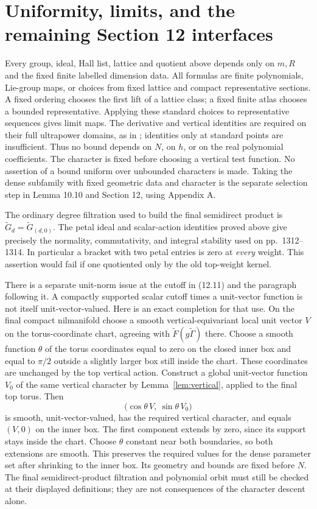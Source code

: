 \documentclass[11pt]{article}
\begin{document}
\section{Uniformity, limits, and the remaining Section 12 interfaces}
Every group, ideal, Hall list, lattice and quotient above depends only on
$m,R$ and the fixed finite labelled dimension data. All formulas are finite
polynomials, Lie-group maps, or choices from fixed lattice and compact
representative sections. A fixed ordering chooses the first lift of a lattice
class; a fixed finite atlas chooses a bounded representative. Applying these
standard choices to representative sequences gives limit maps. The derivative
and vertical identities are required on their full ultrapower domains,
as in \cite{TAUT}; identities only at standard points are insufficient.
Thus no bound depends on $N$, on $h$, or on the real polynomial coefficients.
The character is fixed before choosing a vertical test function. No assertion
of a bound uniform over unbounded characters is made. Taking the dense
subfamily with fixed geometric data and character is the separate selection
step in Lemma 10.10 and Section 12, using Appendix A.

The ordinary degree filtration used to build the final semidirect product
is $\widetilde G_d=\widetilde G_{(d,0)}$. The petal ideal and scalar-action
identities proved above give precisely the normality, commutativity, and
integral stability used on pp.~1312--1314. In particular a bracket with two
petal entries is zero at \emph{every} weight. This assertion would fail if
one quotiented only by the old top-weight kernel.

There is a separate unit-norm issue at the cutoff in (12.11) and the paragraph
following it. A compactly supported scalar cutoff times a unit-vector function
is not itself unit-vector-valued. Here is an exact completion for that use.
On the final compact nilmanifold choose a smooth vertical-equivariant local
unit vector $V$ on the torus-coordinate chart, agreeing with
$\widetilde F(g\widetilde\Gamma)$ there. Choose a smooth function
$\theta$ of the torus coordinates equal to zero on the closed inner box and
equal to $\pi/2$ outside a slightly larger box still inside the chart.
These coordinates are unchanged by the top vertical action. Construct a
global unit-vector function $V_0$ of the same vertical character by
Lemma~\ref{lem:vertical}, applied to the final top torus. Then
\[
 \bigl(\cos\theta\,V,\ \sin\theta\,V_0\bigr)
\]
is smooth, unit-vector-valued, has the required vertical character, and equals
$(V,0)$ on the inner box. The first component extends by zero, since its
support stays inside the chart. Choose $\theta$ constant near both boundaries,
so both extensions are smooth. This preserves the required values for the
dense parameter set after shrinking to the inner box. Its geometry and bounds
are fixed before $N$. The final semidirect-product filtration and polynomial
orbit must still be checked at their displayed definitions; they are not
consequences of the character descent alone.
\end{document}
